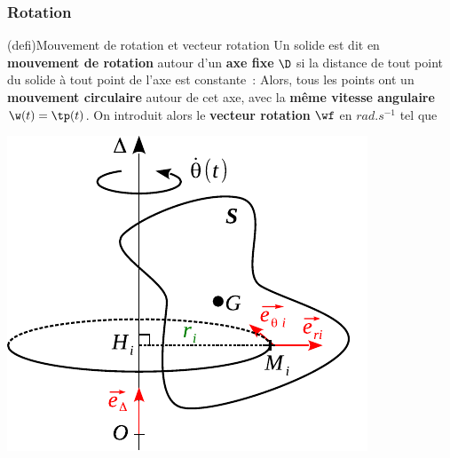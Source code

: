 \documentclass[../../main/main.tex]{subfiles}
\begin{document}
\subsubsection{Rotation}
\begin{tcb*}[sidebyside, righthand ratio=.4](defi){Mouvement de rotation et vecteur rotation}
	Un solide est dit en \textbf{mouvement de rotation} autour d'un \textbf{axe
		fixe} $\D$ si la distance de tout point du solide à tout point de l'axe est constante~:
	\psw{
		\[
			\forall \Mr \in \Sc, \forall A \in \Delta, \quad \norm{\vvr{AM}} = \cte
		\]
	}
	Alors, tous les points ont un \textbf{mouvement circulaire} autour de cet
	axe, avec la \textbf{même vitesse angulaire} $\w(t) = \tp(t)$.
	\smallbreak
	On introduit alors le \textbf{vecteur rotation} $\wf$
	en $\si{rad.s^{-1}}$ tel que
	\psw{
		\[
			\boxed{\wf_{\Sc/\Rc} = \w(t)\vv{u_\D}}
		\]
	}
	\vspace{-15pt}
	\tcblower
	\begin{center}
		\includegraphics[width=.8\linewidth]{sol_rot}
	\end{center}
\end{tcb*}
\end{document}
